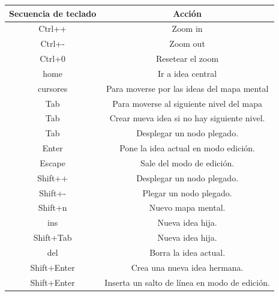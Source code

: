 \begin{tabular}{|c|c|}
	\hline
	\textbf{Secuencia de teclado} &                \textbf{Acción}                \\ \hline
	           Ctrl++             &                    Zoom in                    \\ \hline
	           Ctrl+-             &                   Zoom out                    \\ \hline
	           Ctrl+0             &               Resetear el zoom                \\ \hline
	            home              &               Ir a idea central               \\ \hline
	          cursores            &  Para moverse por las ideas del mapa mental   \\ \hline
	             Tab              &   Para moverse al siguiente nivel del mapa    \\ \hline
	             Tab              &  Crear nueva idea si no hay siguiente nivel.  \\ \hline
	             Tab              &          Desplegar un nodo plegado.           \\ \hline
	            Enter             &     Pone la idea actual en modo edición.      \\ \hline
	           Escape             &           Sale del modo de edición.           \\ \hline
	           Shift++            &          Desplegar un nodo plegado.           \\ \hline
	           Shift+-            &            Plegar un nodo plegado.            \\ \hline
	           Shift+n            &              Nuevo mapa mental.               \\ \hline
	             ins              &               Nueva idea hija.                \\ \hline
	          Shift+Tab           &               Nueva idea hija.                \\ \hline
	             del              &             Borra la idea actual.             \\ \hline
	         Shift+Enter          &         Crea una nueva idea hermana.          \\ \hline
	         Shift+Enter          & Inserta un salto de línea en modo de edición. \\ \hline
\end{tabular} 
